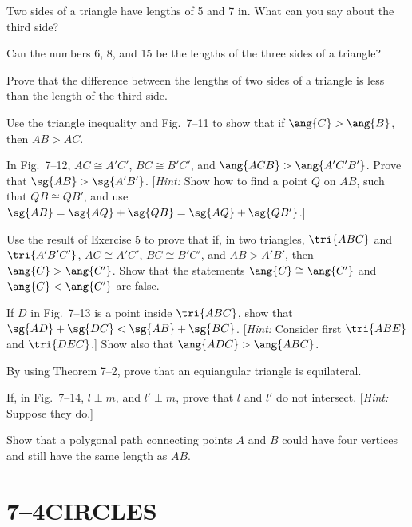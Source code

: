 \documentclass[11pt]{book}
\theoremstyle{bkplain}
\theoremstyle{XIplainnote}
\theoremstyle{bkplain}
\theoremstyle{bkplain}
\begin{document}
\begin{exercisecols}
\begin{exlist}
\item Two sides of a triangle have lengths of 5 and 7 in. What can you say
  about the third side?
\item Can the numbers 6, 8, and 15 be the lengths of the three sides of a
  triangle?
\item Prove that the difference between the lengths of two sides of a triangle
  is less than the length of the third side.
\item[\stex 4.] Use the triangle inequality and Fig.~7--11 to show that if
  $\ang{C} > \ang{B}$, then $AB > AC$.
\exfig{\FIGVIIELEVEN}
\item[\stex 5.] In Fig.~7--12, $AC \cong A'C'$, $BC \cong B'C'$, and
  $\ang{ACB} > \ang{A'C'B'}$. Prove that $\sg{AB} > \sg{A'B'}$.
  [\emph{Hint:} Show how to find a point $Q$ on $AB$, such that
  $QB \cong QB'$, and use $\sg{AB} = \sg{AQ} + \sg{QB} = \sg{AQ} + \sg{QB'}$.]
\exfig{\FIGVIITWELVE}
\item[\stex 6.] Use the result of Exercise 5 to prove that if, in two
  triangles, $\tri{ABC}$ and $\tri{A'B'C'}$, $AC \cong A'C'$,
  $BC \cong B'C'$, and $AB > A'B'$, then $\ang{C} > \ang{C'}$. Show that the
  statements $\ang{C} \cong \ang{C'}$ and $\ang{C} < \ang{C'}$ are false.
\item[\stex 7.] If $D$ in Fig.~7--13 is a point inside $\tri{ABC}$, show that
  $\sg{AD} + \sg{DC} < \sg{AB} + \sg{BC}$. [\emph{Hint:} Consider first
  $\tri{ABE}$ and $\tri{DEC}$.] Show also that $\ang{ADC} > \ang{ABC}$.
\exfig{\FIGVIITHIRTEEN}
\item By using Theorem 7--2, prove that an equiangular triangle is equilateral.
\item If, in Fig.~7--14, $l \perp m$, and $l' \perp m$, prove that $l$ and $l'$
  do not intersect. [\emph{Hint:} Suppose they do.]
\exfig{\FIGVIIFOURTEEN}
\item Show that a polygonal path connecting points $A$ and $B$ could have four
  vertices and still have the same length as $AB$.
\end{exlist}
\end{exercisecols}

\section*{7--4\quad CIRCLES}
\end{document}

